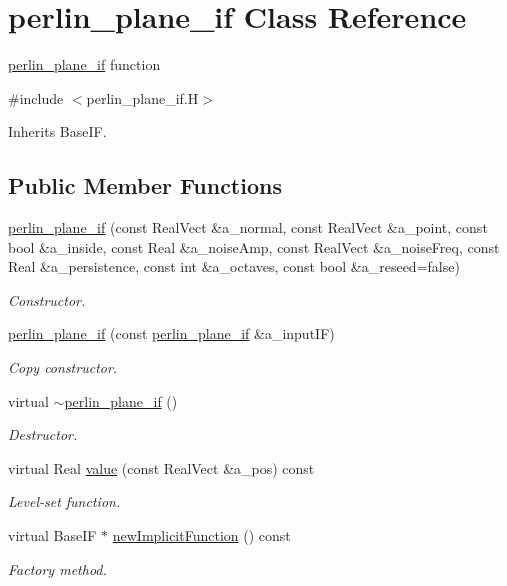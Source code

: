 \hypertarget{classperlin__plane__if}{}\section{perlin\+\_\+plane\+\_\+if Class Reference}
\label{classperlin__plane__if}


\hyperlink{classperlin__plane__if}{perlin\+\_\+plane\+\_\+if} function  




{\ttfamily \#include $<$perlin\+\_\+plane\+\_\+if.\+H$>$}



Inherits Base\+IF.

\subsection*{Public Member Functions}
\begin{DoxyCompactItemize}
\item 
\hyperlink{classperlin__plane__if_a53c879f0e24ec7fca4ecca957b3a1257}{perlin\+\_\+plane\+\_\+if} (const Real\+Vect \&a\+\_\+normal, const Real\+Vect \&a\+\_\+point, const bool \&a\+\_\+inside, const Real \&a\+\_\+noise\+Amp, const Real\+Vect \&a\+\_\+noise\+Freq, const Real \&a\+\_\+persistence, const int \&a\+\_\+octaves, const bool \&a\+\_\+reseed=false)
\begin{DoxyCompactList}\small\item\em Constructor. \end{DoxyCompactList}\item 
\hyperlink{classperlin__plane__if_a6b1718b7c70139ada3b2bf6541473533}{perlin\+\_\+plane\+\_\+if} (const \hyperlink{classperlin__plane__if}{perlin\+\_\+plane\+\_\+if} \&a\+\_\+input\+IF)
\begin{DoxyCompactList}\small\item\em Copy constructor. \end{DoxyCompactList}\item 
virtual \hyperlink{classperlin__plane__if_a82073fafcc10c1ef6e03f076f2ec319a}{$\sim$perlin\+\_\+plane\+\_\+if} ()
\begin{DoxyCompactList}\small\item\em Destructor. \end{DoxyCompactList}\item 
virtual Real \hyperlink{classperlin__plane__if_a44e80eb191419d0c23523d3fa15f4be3}{value} (const Real\+Vect \&a\+\_\+pos) const 
\begin{DoxyCompactList}\small\item\em Level-\/set function. \end{DoxyCompactList}\item 
virtual Base\+IF $\ast$ \hyperlink{classperlin__plane__if_ad2a977ca5a52ad417afe51a7d43cd533}{new\+Implicit\+Function} () const 
\begin{DoxyCompactList}\small\item\em Factory method. \end{DoxyCompactList}\end{DoxyCompactItemize}
